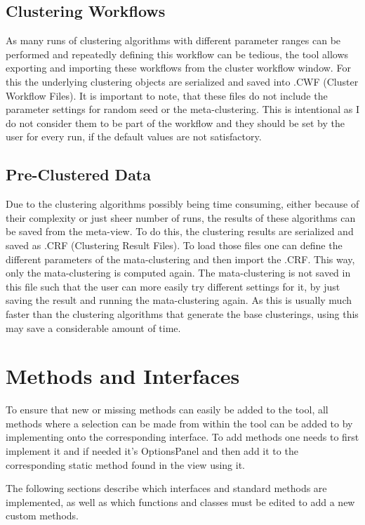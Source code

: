 \documentclass[
	a4paper,
	english,
	twoside,
	openright,               
	11pt                            
	]{report}
\begin{document}
\subsection{Clustering Workflows}
As many runs of clustering algorithms with different parameter ranges can be performed and repeatedly defining this workflow can be tedious, the tool allows exporting and importing these workflows from the cluster workflow window. For this the underlying clustering objects are serialized and saved into .CWF (Cluster Workflow Files). It is important to note, that these files do not include the parameter settings for random seed or the meta-clustering. This is intentional as I do not consider them to be part of the workflow and they should be set by the user for every run, if the default values are not satisfactory.

\subsection{Pre-Clustered Data}
Due to the clustering algorithms possibly being time consuming, either because of their complexity or just sheer number of runs, the results of these algorithms can be saved from the meta-view. To do this, the clustering results are serialized and saved as .CRF (Clustering Result Files). To load those files one can define the different parameters of the mata-clustering and then import the .CRF. This way, only the mata-clustering is computed again. The mata-clustering is not saved in this file such that the user can more easily try different settings for it, by just saving the result and running the mata-clustering again. As this is usually much faster than the clustering algorithms that generate the base clusterings, using this may save a considerable amount of time.

\section{Methods and Interfaces}
To ensure that new or missing methods can easily be added to the tool, all methods where a selection can be made from within the tool can be added to by implementing onto the corresponding interface. To add methods one needs to first implement it and if needed it's OptionsPanel and then add it to the corresponding static method found in the view using it.

The following sections describe which interfaces and standard methods are implemented, as well as which functions and classes must be edited to add a new custom methods.
\end{document}
